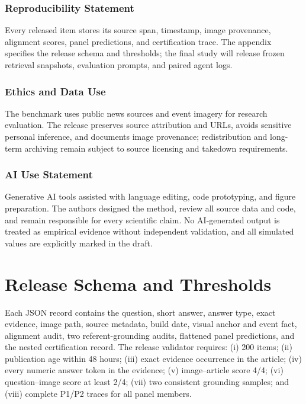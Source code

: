 \documentclass{article}
\begin{document}
\subsubsection*{Reproducibility Statement}
Every released item stores its source span, timestamp, image provenance,
alignment scores, panel predictions, and certification trace.
The appendix specifies the release schema and thresholds; the final study will
release frozen retrieval snapshots, evaluation prompts, and paired agent logs.

\subsubsection*{Ethics and Data Use}
The benchmark uses public news sources and event imagery for research
evaluation.
The release preserves source attribution and URLs, avoids sensitive personal
inference, and documents image provenance; redistribution and long-term
archiving remain subject to source licensing and takedown requirements.

\subsubsection*{AI Use Statement}
Generative AI tools assisted with language editing, code prototyping, and
figure preparation.
The authors designed the method, review all source data and code, and remain
responsible for every scientific claim.
No AI-generated output is treated as empirical evidence without independent
validation, and all simulated values are explicitly marked in the draft.




\appendix
\section{Release Schema and Thresholds}
Each JSON record contains the question, short answer, answer type, exact
evidence, image path, source metadata, build date, visual anchor and event
fact, alignment audit, two referent-grounding audits, flattened panel
predictions, and the nested certification record.
The release validator requires:
(i) 200 items;
(ii) publication age within 48 hours;
(iii) exact evidence occurrence in the article;
(iv) every numeric answer token in the evidence;
(v) image--article score 4/4;
(vi) question--image score at least 2/4;
(vii) two consistent grounding samples;
and (viii) complete P1/P2 traces for all panel members.
\end{document}

